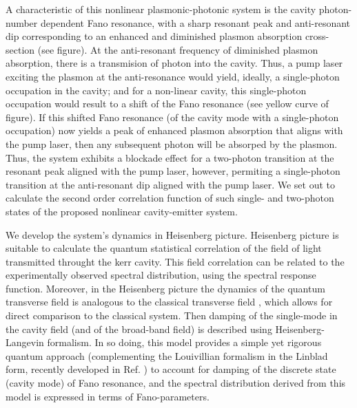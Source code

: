 \documentclass[12pt]{article}
\begin{document}
A characteristic of this nonlinear plasmonic-photonic system is the cavity photon-number 
dependent Fano resonance, with a sharp resonant peak and anti-resonant dip corresponding 
to an enhanced and diminished plasmon absorption cross-section (see figure). At the 
anti-resonant frequency of diminished plasmon absorption, there is a transmision of 
photon into the cavity. Thus, a pump laser exciting the plasmon at the anti-resonance 
would yield, ideally, a single-photon occupation in the cavity; and for a non-linear 
cavity, this single-photon occupation would result to a shift of the Fano resonance
(see yellow curve of figure). If this shifted Fano resonance (of the cavity mode with 
a single-photon occupation) now yields a peak of enhanced plasmon absorption that aligns 
with the pump laser, then any subsequent photon will be absorped by the plasmon. Thus, 
the system exhibits a blockade effect for a two-photon transition at the resonant peak
aligned with the pump laser, however, permiting a single-photon transition at the 
anti-resonant dip aligned with the pump laser. We set out to calculate the second order 
correlation function of such single- and two-photon states of the proposed nonlinear 
cavity-emitter system.

We develop the system's dynamics in Heisenberg picture. Heisenberg picture is 
suitable to calculate the quantum statistical correlation of the field of light 
transmitted throught the kerr cavity. This field correlation can be related to 
the experimentally observed spectral distribution, using the spectral response 
function. \cite{scully1999quantum} Moreover, in the Heisenberg picture the 
dynamics of the quantum transverse field is analogous to the classical 
transverse field \cite{tannoudji1992atom}, which allows for direct comparison 
to the classical system. \cite{pan2019elucidating} Then damping of the 
single-mode in the cavity field (and of the broad-band field) is described 
using Heisenberg-Langevin formalism. In so doing, this model provides a simple 
yet rigorous quantum approach (complementing the Louivillian formalism in the
Linblad form, recently developed in Ref. \cite{finkelstein2015fano, 
finkelstein2016nonlinear}) to account for damping of the discrete state 
(cavity mode) of Fano resonance, and the spectral distribution derived from 
this model is expressed in terms of Fano-parameters. \cite{fano1961effects}
\end{document}
